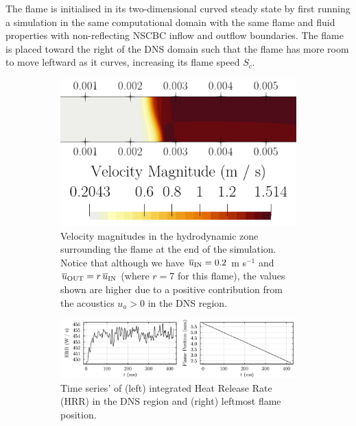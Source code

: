 The flame is initialised in its two-dimensional curved steady state by first running a simulation in the same computational domain with the same flame and fluid properties with non-reflecting NSCBC inflow and outflow boundaries. The flame is placed toward the right of the DNS domain such that the flame has more room to move leftward as it curves, increasing its flame speed $S_c$.

\begin{figure}[t]
\centering
\begin{subfigure}{0.99\textwidth}
\centering
\includegraphics[scale=0.30]{assets/graphs/THERMOAC_mag-v.png}
\caption{Velocity magnitudes in the hydrodynamic zone surrounding the flame at the end of the simulation. Notice that although we have $\overline{u}_{\rm{IN}} = 0.2$ m s$^{-1}$ and $\overline{u}_{\rm{OUT}} = r \, \overline{u}_{\rm{IN}}$ (where $r = 7$ for this flame), the values shown are higher due to a positive contribution from the acoustics $u_a > 0$ in the DNS region.}
\label{fig:mag-v}
\end{subfigure}

\vspace*{0.5em}

\begin{subfigure}{0.99\textwidth}
\centering
\includegraphics[scale=0.35]{assets/graphs/2mmx1m_still_hrr-flame.pdf}
\caption{Time series' of (left) integrated Heat Release Rate (HRR) in the DNS region and (right) leftmost flame position.}
\label{fig:hrr-flame}
\end{subfigure}
\caption{}
\label{fig:flame}
\end{figure}

